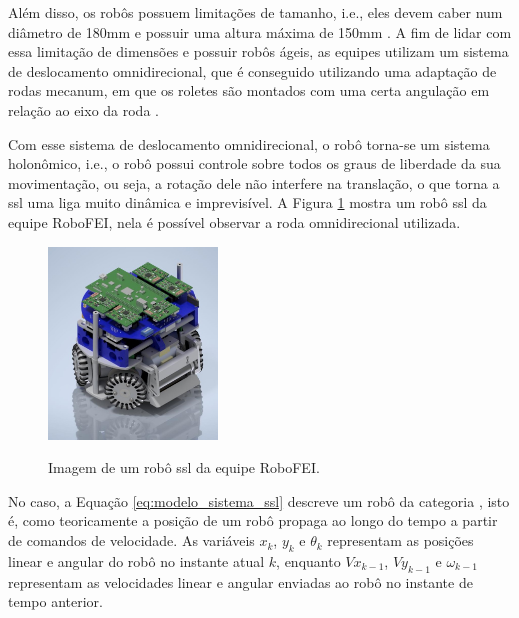 \documentclass[acronym, symbols, table, deposito]{fei}
\begin{document}
		Além disso, os robôs possuem limitações de tamanho, i.e., eles devem caber num diâmetro de 180mm e possuir uma altura máxima de 150mm \cite{rules}. A fim de lidar com essa limitação de dimensões e possuir robôs ágeis, as equipes utilizam um sistema de deslocamento omnidirecional, que é conseguido utilizando uma adaptação de rodas mecanum, em que os roletes são montados com uma certa angulação em relação ao eixo da roda \cite{aguiarreformulaccao}.
		
		Com esse sistema de deslocamento omnidirecional, o robô torna-se um sistema holonômico, i.e., o robô possui controle sobre todos os graus de liberdade da sua movimentação, ou seja, a rotação dele não interfere na translação, o que torna a \acrshort{ssl} uma liga muito dinâmica e imprevisível. A Figura \ref{fig:exemplo_robo_ssl} mostra um robô \acrshort{ssl} da equipe RoboFEI, nela é possível observar a roda omnidirecional utilizada.
		
		\begin{figure}[!htb]
			\centering
			\caption{Imagem de um robô \acrshort{ssl} da equipe RoboFEI.} 
			\includegraphics[width=0.4\textwidth]{Foto_Robo_2012.jpg}
			\label{fig:exemplo_robo_ssl}
		\end{figure}
		
		No caso, a Equação \eqref{eq:modelo_sistema_ssl} descreve um robô da categoria , isto é, como teoricamente a posição de um robô propaga ao longo do tempo a partir de comandos de velocidade. As variáveis $x_k$, $y_k$ e $\theta_k$ representam as posições linear e angular do robô no instante atual $k$, enquanto $Vx_{k-1}$, $Vy_{k-1}$ e $\omega_{k-1}$ representam as velocidades linear e angular enviadas ao robô no instante de tempo anterior.
		
\end{document}
